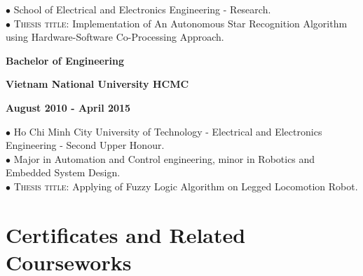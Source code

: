 \documentclass[10pt]{article}
\begin{document}
        \vspace{-5mm}

        $\bullet$ {School of Electrical and Electronics Engineering - Research.} \\
        $\bullet$ \textsc{Thesis title}: Implementation of An Autonomous Star Recognition Algorithm using Hardware-Software Co-Processing Approach.


        \begin{multicols}{3}
            \begin{flushleft}
                \textbf{Bachelor of Engineering}
            \end{flushleft}

            \columnbreak

            \begin{center}
                \textbf{Vietnam National University HCMC}
            \end{center}

            \columnbreak

            \begin{flushright}
                \textbf{August 2010 - April 2015}
            \end{flushright}
        \end{multicols}

        \vspace{-5mm}

        $\bullet$ {Ho Chi Minh City University of Technology - Electrical and Electronics Engineering - Second Upper Honour.} \\
        $\bullet$ {Major in Automation and Control engineering, minor in Robotics and Embedded System Design.} \\
        $\bullet$ \textsc{Thesis title}: Applying of Fuzzy Logic Algorithm on Legged Locomotion Robot.

    \vspace{-2mm}
    \section{Certificates and Related Courseworks}
        \vspace{-2mm}
\end{document}
